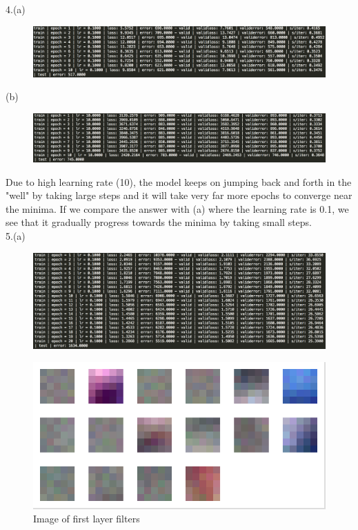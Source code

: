 \documentclass[11pt]{article}
\begin{document}
4.(a)
\begin{figure}[H]
\centering
\includegraphics[scale=0.5]{torch/outputLRpoint1.png}
\caption{ \label{fig5}}
\end{figure}

(b)
\begin{figure}[H]
\centering
\includegraphics[scale=0.5]{torch/outputLR10.png}
\caption{ \label{fig5}}
\end{figure}
Due to high learning rate (10), the model keeps on jumping back and forth in the "well" by taking large steps and it will take very far more epochs to converge near the minima. If we compare the answer with (a) where the learning rate is 0.1, we see that it gradually progress towards the minima by taking small steps.
\\
5.(a)
\begin{figure}[H]
\centering
\includegraphics[scale=0.5]{torch/outputCNN.png}
\caption{ \label{fig5}}
\end{figure}

\begin{figure}[H]
\centering
\includegraphics[scale=0.5]{torch/weightCNN.png}
\caption{Image of first layer filters \label{fig5}}
\end{figure}
\end{document}
